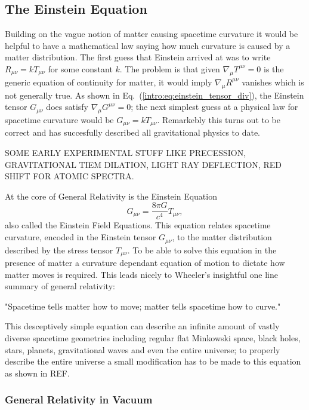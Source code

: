 \subsection{The Einstein Equation}
Building on the vague notion of matter causing spacetime curvature it would be helpful to have a mathematical law saying how much curvature is caused by a matter distribution. The first guess that Einstein arrived at was to write $R_{\mu\nu}=kT_{\mu\nu}$ for some constant $k$. The problem is that given $\nabla_\mu T^{\mu\nu}=0$ is the generic equation of continuity for matter, it would imply $\nabla_\mu R^{\mu\nu}$ vanishes which is not generally true. As shown in Eq.~(\ref{intro:eq:einstein_tensor_div}), the Einstein tensor $G_{\mu\nu}$ does satisfy $\nabla_\mu G^{\mu\nu}=0$; the next simplest guess at a physical law for spacetime curvature would be $G_{\mu\nu} = k T_{\mu\nu}$. Remarkebly this turns out to be correct and has succesfully described all gravitational physics to date. 

SOME EARLY EXPERIMENTAL STUFF LIKE PRECESSION, GRAVITATIONAL TIEM DILATION, LIGHT RAY DEFLECTION, RED SHIFT FOR ATOMIC SPECTRA.

At the core of General Relativity is the Einstein Equation
\begin{equation}\label{intro:eq:einstein}
G_{\mu\nu} = \frac{8 \pi G}{c^4}T_{\mu\nu},
\end{equation}
also called the Einstein Field Equations. This equation relates spacetime curvature, encoded in the Einstein tensor $G_{\mu\nu}$, to the matter distribution described by the stress tensor $T_{\mu\nu}$. To be able to solve this equation in the presence of matter a curvature dependant equation of motion to dictate how matter moves is required. This leads nicely to Wheeler's insightful one line summary of general relativity: 

{\it \begin{center}{"Spacetime tells matter how to move; matter tells spacetime how to curve."}\end{center} } 


This desceptively simple equation can describe an infinite amount of vastly diverse spacetime geometries including regular flat Minkowski space, black holes, stars, planets, gravitational waves and even the entire universe; to properly describe the entire universe a small modification has to be made to this equation as shown in REF.



\subsubsection*{General Relativity in Vacuum}


